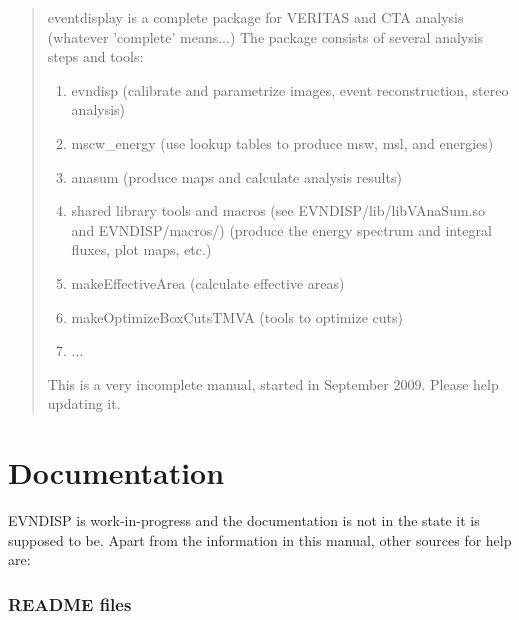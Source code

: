 \documentclass[titlepage,a4paper,twoside,11pt]{report}
\newcommand{\clearemptydoublepage}{\newpage{\pagestyle{empty}\cleardoublepage}}
\begin{document}




\thispagestyle{empty}

\begin{abstract}

eventdisplay is a complete package for VERITAS and CTA analysis (whatever 'complete' means...)
The package consists of several analysis steps and tools:

\begin{enumerate}
\item evndisp (calibrate and parametrize images, event reconstruction, stereo analysis)
\item mscw\_energy (use lookup tables to produce msw, msl, and energies)
\item anasum (produce maps and calculate analysis results)
\item shared library tools and macros (see EVNDISP/lib/libVAnaSum.so and EVNDISP/macros/)  (produce the energy spectrum and integral fluxes, plot maps, etc.) 
\item makeEffectiveArea (calculate effective areas)
\item makeOptimizeBoxCutsTMVA (tools to optimize cuts)
\item ...
\end{enumerate}

This is a very incomplete manual, started in September 2009. Please help updating it.

\end{abstract}


\setcounter{page}{1}
\tableofcontents
\clearemptydoublepage



\chapter{Documentation}

EVNDISP is work-in-progress and the documentation is not in the state it is supposed to be. 
Apart from the information in this manual, other sources for help are:

\subsection*{README files}
\end{document}

